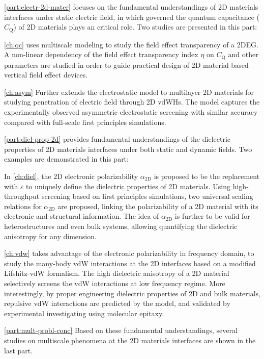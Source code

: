 \autoref{part:electr-2d-mater} focuses on the fundamental
understandings of 2D materials interfaces under static electric field,
in which governed the quantum capacitance ($C_{\mathrm{Q}}$) of 2D
materials plays an critical role.
%
Two studies are
presented in this part:
%

\autoref{ch:qc} uses multiscale modeling to study the field effect
transparency of a 2DEG. A non-linear dependency of the field effect
transparency index $\eta$ on $C_{\mathrm{Q}}$ and other parameters are
studied in order to guide practical design of 2D material-based
vertical field effect devices.
%

\autoref{ch:asym} Further extends the electrostatic model to
multilayer 2D materials for studying penetration of electric field
through 2D vdWHs. The model captures the experimentally observed
asymmetric electrostatic screening with similar accuracy compared with
full-scale first principles simulations.

\autoref{part:diel-prop-2d} provides fundamental understandings of the
dielectric properties of 2D materials interfaces under both static and
dynamic fields. Two examples are demonstrated in this part:
%

In \autoref{ch:diel}, the 2D electronic polarizability
$\alpha_{\mathrm{2D}}$ is proposed to be the replacement with
$\varepsilon$ to uniquely define the dielectric properties of 2D
materials. Using high-throughput screening based on first principles
simulations, two universal scaling relations for
$\alpha_{\mathrm{2D}}$ are proposed, linking the polarizability of a
2D material with its electronic and structural information.
%
The idea
of $\alpha_{\mathrm{2D}}$ is further to be valid for heterostructures
and even bulk systems, allowing quantifying the dielectric anisotropy
for any dimension.
%

\autoref{ch:vdw} takes advantage of the electronic polarizability
in frequency domain, to study the many-body vdW interactions at the 2D
interfaces based on a modified Lifshitz-vdW
formalism. The high dielectric anisotropy of a 2D material selectively
screens the vdW interactions at low frequency regime. More
interestingly, by proper engineering dielectric properties of 2D and
bulk materials, repulsive vdW interactions are predicted by the model,
and validated by experimental investigating using molecular epitaxy.

\autoref{part:mult-probl-conc} Based on these fundamental understandings, several
studies on multiscale phenomena at the 2D materials interfaces are
shown in the last part.
%

